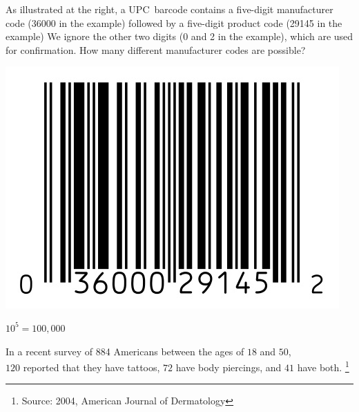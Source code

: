 \documentclass[addpoints,12pt]{exam}
\begin{document}
\begin{questions}

\begin{multicols}{2}
\question[10]
As illustrated at the right,
a UPC~barcode contains
a five-digit manufacturer code (36000 in the example)
followed by a five-digit product code
(29145 in the example)
We ignore the other two digits
(0 and 2 in the example), which are used for confirmation.
How many different
manufacturer codes are possible?
\break\\
\begin{center}\includegraphics[scale=.5]{Barcode}\end{center}
\end{multicols}
\begin{solution}$10^5=100,000$\end{solution}
\newpage

\question[24] In a recent survey of 884 Americans between the ages
of $18$ and $50$,\\ $120$ reported that they have tattoos,
$72$ have body piercings, and $41$ have both.
\footnote{Source: 2004, American Journal of Dermatology}

\end{questions}
\end{document}

